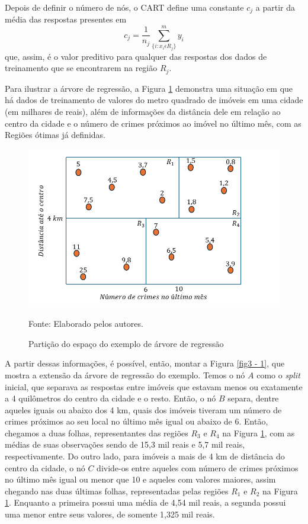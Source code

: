 \documentclass[a4paper,12pt]{article}[abntex2]
\begin{document}
Depois de definir o número de nós, o CART define uma constante \(c_j\) a partir da média das respostas presentes em 
\begin{equation}
    c_j = \frac{1}{n_j}\sum^m_{\{i: x_i \epsilon R_j\}}y_i
\end{equation}
que, assim, é o valor preditivo para qualquer das respostas dos dados de treinamento que se encontrarem na região \(R_j\).

Para ilustrar a árvore de regressão, a Figura \ref{fig2 - 1} demonstra uma situação em que há dados de treinamento de valores do metro quadrado de imóveis em uma cidade (em milhares de reais), além de informações da distância dele em relação ao centro da cidade e o número de crimes próximos ao imóvel no último mês, com as Regiões ótimas já definidas.

\begin{figure}[H]
    \centering
    \caption{Partição do espaço do exemplo de árvore de regressão} 
    \includegraphics[width=1.0\textwidth]{APS/fig2 - 1.png}
    \label{fig2 - 1}
    
    \footnotesize{Fonte: Elaborado pelos autores.}
\end{figure}

A partir dessas informações, é possível, então, montar a Figura \ref{fig3 - 1}, que mostra a extensão da árvore de regressão do exemplo. Temos o nó \(A\) como o \textit{split} inicial, que separava as respostas entre imóveis que estavam menos ou exatamente a 4 quilômetros do centro da cidade e o resto. Então, o nó \(B\) separa, dentre aqueles iguais ou abaixo dos 4 km, quais dos imóveis tiveram um número de crimes próximos ao seu local no último mês igual ou abaixo de 6. Então, chegamos a duas folhas, representantes das regiões \(R_3\) e \(R_4\) na Figura \ref{fig2 - 1}, com as médias de suas observações sendo de 15,3 mil reais e 5,7 mil reais, respectivamente. Do outro lado, para imóveis a mais de 4 km de distância do centro da cidade, o nó \(C\) divide-os entre aqueles com número de crimes próximos no último mês igual ou menor que 10 e aqueles com valores maiores, assim chegando nas duas últimas folhas, representadas pelas regiões \(R_1\) e \(R_2\) na Figura \ref{fig2 - 1}. Enquanto a primeira possui uma média de 4,54 mil reais, a segunda possui uma menor entre seus valores, de somente 1,325 mil reais.
\end{document}
